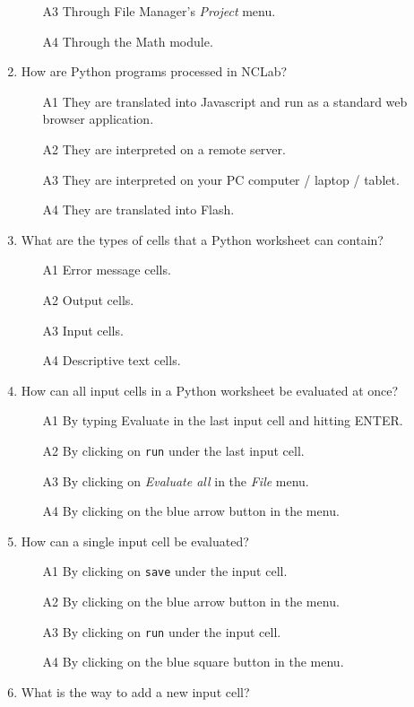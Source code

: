 \begin{enumerate}
\begin{enumerate}
\item[A3] Through File Manager's {\em Project} menu.
\item[A4] Through the Math module.
\end{enumerate}
\item How are Python programs processed in NCLab?
\begin{enumerate}
\item[A1] They are translated into Javascript and run as a standard web browser application.
\item[A2] They are interpreted on a remote server.
\item[A3] They are interpreted on your PC computer / laptop / tablet.
\item[A4] They are translated into Flash.
\end{enumerate}
\item What are the types of cells that a Python worksheet can contain?
\begin{enumerate}
\item[A1] Error message cells.
\item[A2] Output cells.
\item[A3] Input cells.
\item[A4] Descriptive text cells.
\end{enumerate}
\item How can all input cells in a Python worksheet be evaluated at once?
\begin{enumerate}
\item[A1] By typing Evaluate in the last input cell and hitting ENTER.
\item[A2] By clicking on {\tt run} under the last input cell.
\item[A3] By clicking on {\em Evaluate all} in the {\em File} menu. 
\item[A4] By clicking on the blue arrow button in the menu.
\end{enumerate}
\item How can a single input cell be evaluated?
\begin{enumerate}
\item[A1] By clicking on {\tt save} under the input cell.
\item[A2] By clicking on the blue arrow button in the menu.
\item[A3] By clicking on {\tt run} under the input cell.
\item[A4] By clicking on the blue square button in the menu.
\end{enumerate}
\item What is the way to add a new input cell?

\end{enumerate}
